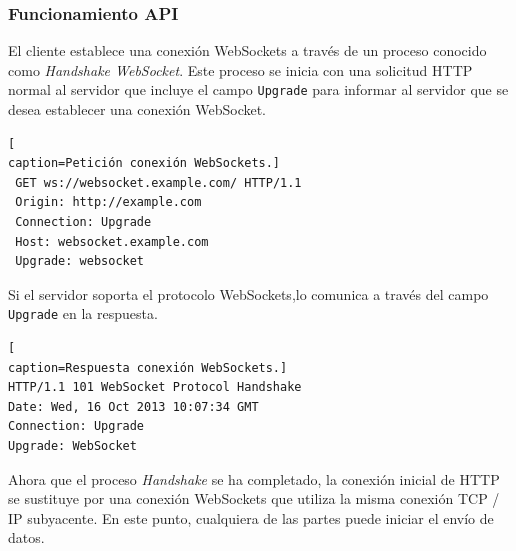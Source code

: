 \subsubsection*{Funcionamiento API}
El cliente establece una conexión WebSockets\cite{WebSocketEjemplo} a través de un proceso conocido como \textit{Handshake WebSocket}. Este proceso se inicia con una solicitud HTTP normal al servidor que incluye el campo \texttt{Upgrade} para informar al servidor que se desea establecer una conexión WebSocket.
\begin{lstlisting}[
caption=Petición conexión WebSockets.]
 GET ws://websocket.example.com/ HTTP/1.1
 Origin: http://example.com
 Connection: Upgrade
 Host: websocket.example.com
 Upgrade: websocket
\end{lstlisting}
Si el servidor soporta el protocolo WebSockets,lo comunica a través del campo \texttt{Upgrade} en la respuesta.
\begin{lstlisting}[
caption=Respuesta conexión WebSockets.]
HTTP/1.1 101 WebSocket Protocol Handshake
Date: Wed, 16 Oct 2013 10:07:34 GMT
Connection: Upgrade
Upgrade: WebSocket
\end{lstlisting}
Ahora que el proceso \textit{Handshake} se ha completado, la conexión inicial de HTTP se sustituye por una conexión WebSockets que utiliza la misma conexión TCP / IP subyacente. En este punto, cualquiera de las partes puede iniciar el envío de datos.
